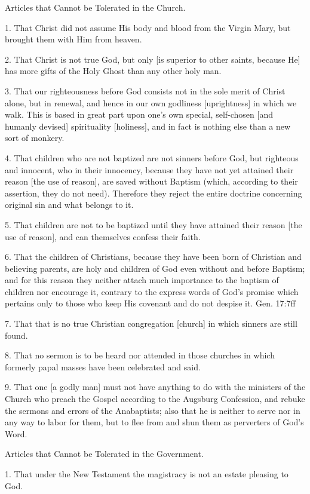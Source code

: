 Articles that Cannot be Tolerated in the Church.

1. That Christ did not assume His body and blood from the Virgin Mary, but brought them with Him from heaven.

2. That Christ is not true God, but only [is superior to other saints, because He] has more gifts of the Holy Ghost than any other holy man.

3. That our righteousness before God consists not in the sole merit of Christ alone, but in renewal, and hence in our own godliness [uprightness] in which we walk. This is based in great part upon one's own special, self-chosen [and humanly devised] spirituality [holiness], and in fact is nothing else than a new sort of monkery.

4. That children who are not baptized are not sinners before God, but righteous and innocent, who in their innocency, because they have not yet attained their reason [the use of reason], are saved without Baptism (which, according to their assertion, they do not need). Therefore they reject the entire doctrine concerning original sin and what belongs to it.

5. That children are not to be baptized until they have attained their reason [the use of reason], and can themselves confess their faith.

6. That the children of Christians, because they have been born of Christian and believing parents, are holy and children of God even without and before Baptism; and for this reason they neither attach much importance to the baptism of children nor encourage it, contrary to the express words of God's promise which pertains only to those who keep His covenant and do not despise it. Gen. 17:7ff

7. That that is no true Christian congregation [church] in which sinners are still found.

8. That no sermon is to be heard nor attended in those churches in which formerly papal masses have been celebrated and said.

9. That one [a godly man] must not have anything to do with the ministers of the Church who preach the Gospel according to the Augsburg Confession, and rebuke the sermons and errors of the Anabaptists; also that he is neither to serve nor in any way to labor for them, but to flee from and shun them as perverters of God's Word.

Articles that Cannot be Tolerated in the Government.

1. That under the New Testament the magistracy is not an estate pleasing to God.

